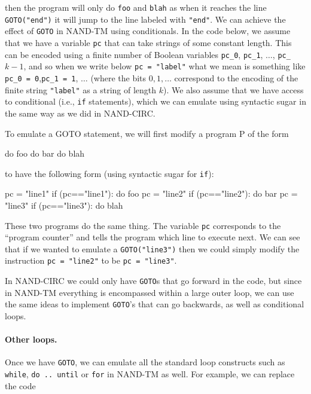 then the program will only do \texttt{foo} and \texttt{blah} as when it
reaches the line \texttt{GOTO("end")} it will jump to the line labeled
with \texttt{"end"}. We can achieve the effect of \texttt{GOTO} in
NAND-TM using conditionals. In the code below, we assume that we have a
variable \texttt{pc} that can take strings of some constant length. This
can be encoded using a finite number of Boolean variables
\texttt{pc\_0}, \texttt{pc\_1}, \(\ldots\), \texttt{pc\_}\(k-1\), and so
when we write below \texttt{pc = "label"} what we mean is something like
\texttt{pc\_0 = 0},\texttt{pc\_1 = 1}, \(\ldots\) (where the bits
\(0,1,\ldots\) correspond to the encoding of the finite string
\texttt{"label"} as a string of length \(k\)). We also assume that we
have access to conditional (i.e., \texttt{if} statements), which we can
emulate using syntactic sugar in the same way as we did in NAND-CIRC.

To emulate a GOTO statement, we will first modify a program P of the
form

\begin{code}
do foo
do bar
do blah
\end{code}

to have the following form (using syntactic sugar for \texttt{if}):

\begin{code}
pc = "line1"
if (pc=="line1"):
    do foo
    pc = "line2"
if (pc=="line2"):
    do bar
    pc = "line3"
if (pc=="line3"):
    do blah
\end{code}

These two programs do the same thing. The variable \texttt{pc}
corresponds to the ``program counter'' and tells the program which line
to execute next. We can see that if we wanted to emulate a
\texttt{GOTO("line3")} then we could simply modify the instruction
\texttt{pc = "line2"} to be \texttt{pc = "line3"}.

In NAND-CIRC we could only have \texttt{GOTO}s that go forward in the
code, but since in NAND-TM everything is encompassed within a large
outer loop, we can use the same ideas to implement \texttt{GOTO}'s that
can go backwards, as well as conditional loops.

\paragraph{Other loops.} Once we have \texttt{GOTO}, we can emulate all
the standard loop constructs such as \texttt{while},
\texttt{do .. until} or \texttt{for} in NAND-TM as well. For example, we
can replace the code

